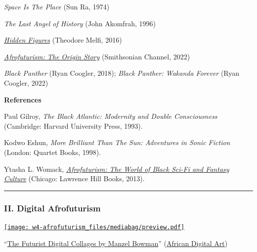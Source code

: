 \documentclass[
  letterpaper,
  DIV=11,
  numbers=noendperiod]{scrartcl}
\begin{document}
\emph{Space Is The Place} (Sun Ra, 1974)

\emph{The Last Angel of History} (John Akomfrah, 1996)

\href{https://www.justwatch.com/us/movie/hidden-figures}{\emph{Hidden
Figures}} (Theodore Melfi, 2016)

\href{https://www.smithsonianchannel.com/special/afrofuturism-the-origin-story}{\emph{Afrofuturism:
The Origin Story}} (Smithsonian Channel, 2022)

\emph{Black Panther} (Ryan Coogler, 2018); \emph{Black Panther: Wakanda
Forever} (Ryan Coogler, 2022)

\textbf{References}

Paul Gilroy, \emph{The Black Atlantic: Modernity and Double
Consciousness} (Cambridge: Harvard University Press, 1993).

Kodwo Eshun, \emph{More Brilliant Than The Sun: Adventures in Sonic
Fiction} (London: Quartet Books, 1998).

Ytasha L. Womack,
\href{https://ebookcentral.proquest.com/lib/emerson/reader.action?docID=1381831\&ppg=1}{\emph{Afrofuturism:
The World of Black Sci-Fi and Fantasy Culture}} (Chicago: Lawrence Hill
Books, 2013).

\begin{center}\rule{0.5\linewidth}{0.5pt}\end{center}

\hypertarget{ii.-digital-afrofuturism}{%
\subsubsection{II. Digital
Afrofuturism}\label{ii.-digital-afrofuturism}}

\href{https://www.manzel.biz/gallery}{\texttt{[image: w4-afrofuturism\_files/mediabag/preview.pdf]}}~~

``\href{https://www.africandigitalart.com/the-futurist-digital-collages-by-manzel-bowman/}{The
Futurist Digital Collages by Manzel Bowman}''
(\href{http://africandigitalart.com}{African Digital Art})
\end{document}
